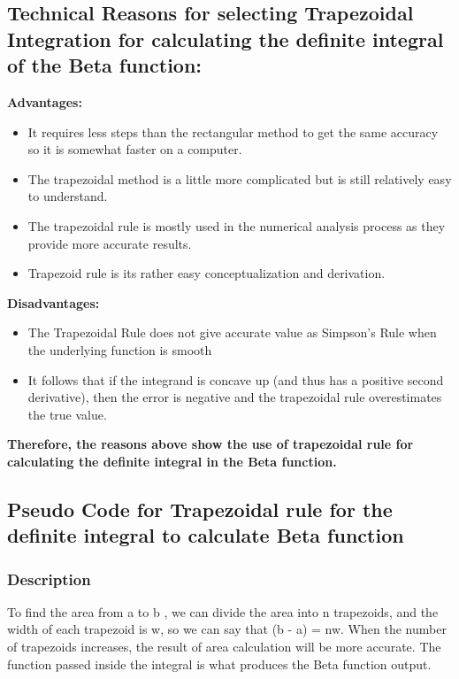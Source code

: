 \documentclass[letterpaper, 11pt]{article}
\begin{document}
        \subsection{\textbf{Technical Reasons for selecting Trapezoidal Integration for calculating the definite integral of the Beta function: }}
        \textbf{Advantages: }
        \begin{itemize}
            \item It requires less steps than the rectangular method to get the same accuracy so it is somewhat faster on a computer.
            \item The trapezoidal method is a little more complicated but is still relatively easy to understand.
            \item
            The trapezoidal rule is mostly used in the numerical analysis process as they provide more     accurate results.
            \item Trapezoid rule is its rather easy conceptualization and derivation. \cite{trapezoidal3}

        \end{itemize}
        \textbf{Disadvantages: }
        \begin{itemize}
            \item The Trapezoidal Rule does not give accurate value as Simpson’s Rule when the underlying function is smooth 
            \item It follows that if the integrand is concave up (and thus has a positive second derivative), then the error is negative and the trapezoidal rule overestimates the true value.
        \end{itemize} 
    \textbf{Therefore, the reasons above show the use of trapezoidal rule for calculating the definite integral in the Beta function.}\\
    
    \newpage
    
    \subsection{Pseudo Code for Trapezoidal rule for the definite integral to calculate Beta function}
            \subsubsection{Description}
            To find the area from a to b , we can divide the area into n trapezoids, and the width of each trapezoid is w, so we can say that (b - a) = nw. When the number of trapezoids increases, the result of area calculation will be more accurate. The function passed inside the integral is what produces the Beta function output.\cite{trapezoidal1}
\end{document}

